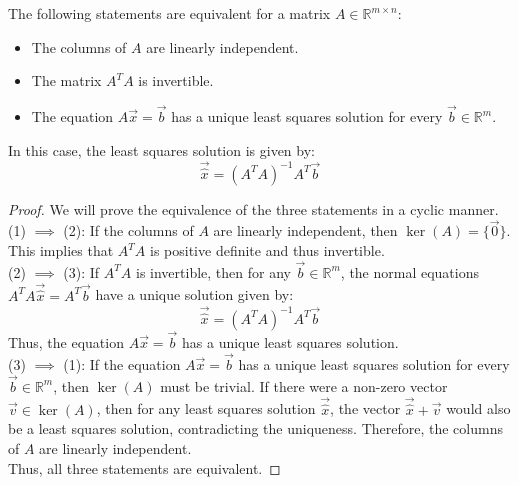 \begin{theorem}
    The following statements are equivalent for a matrix $A \in \mathbb{R}^{m \times n}$:
    \begin{itemize}[itemsep=1pt,label=$\circ$]
        \item The columns of $A$ are linearly independent.
        \item The matrix $A^T A$ is invertible.
        \item The equation $A \vec{x} = \vec{b}$ has a unique least squares solution for every $\vec{b} \in \mathbb{R}^m$.
    \end{itemize}
    In this case, the least squares solution is given by:
    \[
        \vec{\hat{x}} = (A^T A)^{-1} A^T \vec{b}
    \]
\end{theorem}
\begin{proof}
    We will prove the equivalence of the three statements in a cyclic manner. \\
    (1) $\implies$ (2): If the columns of $A$ are linearly independent, then $\ker(A) = \{\vec{0}\}$. This implies that $A^T A$ is positive definite and thus invertible. \\
    (2) $\implies$ (3): If $A^T A$ is invertible, then for any $\vec{b} \in \mathbb{R}^m$, the normal equations $A^T A \vec{\hat{x}} = A^T \vec{b}$ have a unique solution given by:
    \[
        \vec{\hat{x}} = (A^T A)^{-1} A^T \vec{b}
    \]
    Thus, the equation $A \vec{x} = \vec{b}$ has a unique least squares solution. \\
    (3) $\implies$ (1): If the equation $A \vec{x} = \vec{b}$ has a unique least squares solution for every $\vec{b} \in \mathbb{R}^m$, then $\ker(A)$ must be trivial. If there were a non-zero vector $\vec{v} \in \ker(A)$, then for any least squares solution $\vec{\hat{x}}$, the vector $\vec{\hat{x}} + \vec{v}$ would also be a least squares solution, contradicting the uniqueness. Therefore, the columns of $A$ are linearly independent. \\
    Thus, all three statements are equivalent.
\end{proof}

